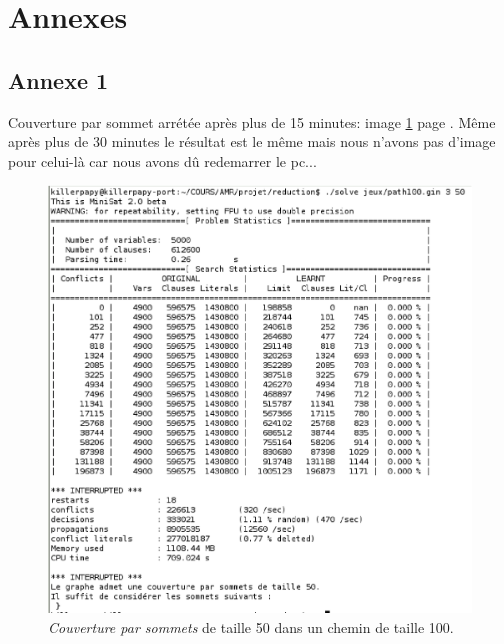  \section{Annexes}
  \subsection{Annexe 1 \label{an1}}
  Couverture par sommet arrétée après plus de 15 minutes: image
  \ref{lourd} page \pageref{lourd}. Même après plus de 30 minutes le
  résultat est le même mais nous n'avons pas d'image pour celui-là car
  nous avons dû redemarrer le pc...

  \begin{figure}[!ht]
   \begin{center}
    \includegraphics[width=12cm]{images/couv100.eps}
    \caption{\emph{Couverture par sommets} de taille 50 dans un chemin
    de taille 100.\label{lourd}}
   \end{center}
  \end{figure}

  \newpage

